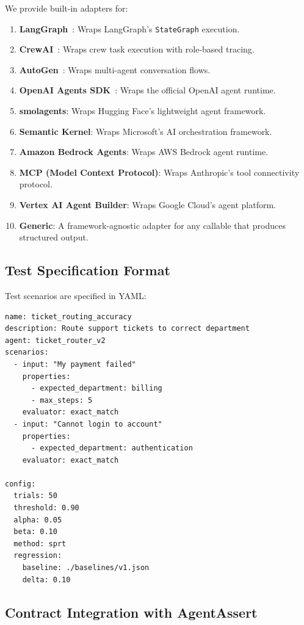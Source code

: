 We provide built-in adapters for:
\begin{enumerate}[leftmargin=*]
  \item \textbf{LangGraph}~\citep{langgraph2024}: Wraps LangGraph's
    \texttt{StateGraph} execution.
  \item \textbf{CrewAI}~\citep{crewai2024}: Wraps crew task execution
    with role-based tracing.
  \item \textbf{AutoGen}~\citep{wu2023autogen}: Wraps multi-agent
    conversation flows.
  \item \textbf{OpenAI Agents SDK}~\citep{openai2025agents}: Wraps the
    official OpenAI agent runtime.
  \item \textbf{smolagents}: Wraps Hugging Face's lightweight agent
    framework.
  \item \textbf{Semantic Kernel}: Wraps Microsoft's AI orchestration
    framework.
  \item \textbf{Amazon Bedrock Agents}: Wraps AWS Bedrock agent runtime.
  \item \textbf{MCP (Model Context Protocol)}: Wraps Anthropic's tool
    connectivity protocol.
  \item \textbf{Vertex AI Agent Builder}: Wraps Google Cloud's agent
    platform.
  \item \textbf{Generic}: A framework-agnostic adapter for any callable
    that produces structured output.
\end{enumerate}

\subsection{Test Specification Format}
\label{sec:implementation:spec}

Test scenarios are specified in YAML:

\begin{verbatim}
name: ticket_routing_accuracy
description: Route support tickets to correct department
agent: ticket_router_v2
scenarios:
  - input: "My payment failed"
    properties:
      - expected_department: billing
      - max_steps: 5
    evaluator: exact_match
  - input: "Cannot login to account"
    properties:
      - expected_department: authentication
    evaluator: exact_match

config:
  trials: 50
  threshold: 0.90
  alpha: 0.05
  beta: 0.10
  method: sprt
  regression:
    baseline: ./baselines/v1.json
    delta: 0.10
\end{verbatim}

\subsection{Contract Integration with AgentAssert}
\label{sec:implementation:contracts}

